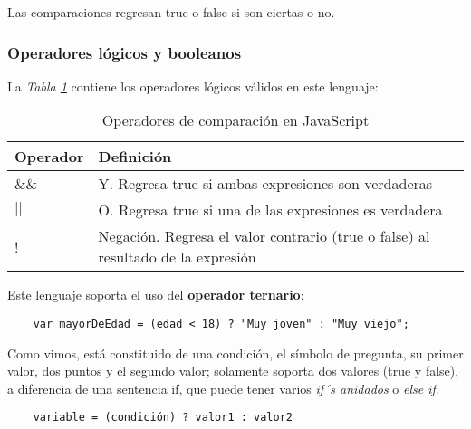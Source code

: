 Las comparaciones regresan true o false si son ciertas o no.


\subsubsection{Operadores lógicos y booleanos}

La \textit{Tabla \ref{tab: 5}} contiene los operadores lógicos válidos en este lenguaje:
\begin{table}[H]
    \begin{center}
        \caption{Operadores de comparación en JavaScript}
        \label{tab: 5}
        \begin{tabular}{m{3cm} m{10cm}}
            \hline
            \textbf{Operador}&\textbf{Definición} \\
            \hline
            \&\& & Y. Regresa true si ambas expresiones son verdaderas \\
            $||$ & O. Regresa true si una de las expresiones es verdadera \\
            ! & Negación. Regresa el valor contrario (true o false) al resultado de la expresión \\
            \hline
        \end{tabular}
    \end{center}
\end{table}

Este lenguaje soporta el uso del \textbf{operador ternario}:
\begin{lstlisting}
    var mayorDeEdad = (edad < 18) ? "Muy joven" : "Muy viejo";
\end{lstlisting}

Como vimos, está constituido de una condición, el símbolo de pregunta, su primer valor, dos puntos y el segundo valor; solamente soporta dos valores (true y false), a diferencia de una sentencia if, que puede tener varios \textit{if´s anidados} o \textit{else if}.
\begin{lstlisting}
    variable = (condición) ? valor1 : valor2
\end{lstlisting}
